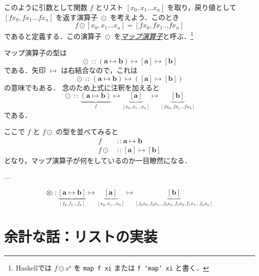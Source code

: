 \documentclass[a4paper,draft]{jsbook}
\newcommand{\programminglanguage}[1]{\textsf{#1}}
\newcommand{\haskell}{\programminglanguage{Haskell}}
\newcommand{\keyword}[1]{{\underline{\emph{#1}}}}
\newcommand{\code}[1]{\texttt{#1}}
\newcommand{\mType}[1]{\mathbf{#1}}
\newcommand{\mListType}[1]{[\mType{#1}]}
\newcommand{\mListWith}[1]{\left[#1\right]}
\newcommand{\mList}[1]{{#1}^\mathrm{s}}
\DeclareMathOperator{\mIn}{{:\!:}}
\DeclareMathOperator{\mMapsTo}{\mapsto}
\DeclareMathOperator{\mMapList}{\odot}
\newcommand{\mProjection}[2]{#1\mMapsTo#2}
\newcommand{\mathTypeParameter}[1]{\mathbf{#1}}
\newcommand{\mathListWith}[1]{\left[#1\right]}
\newcommand{\mathApplicativeMap}{\mathbin{\otimes}}
\newcommand{\mathIn}{\mathrel{::}}
\begin{document}
このように引数として関数 $f$ とリスト $\mListWith{x_0,x_1\dots x_n}$ を取り，戻り値として $\mListWith{fx_0,fx_1\dots fx_n}$ を返す演算子 $\mMapList$ を考えよう．このとき
\begin{equation}
f\mMapList\mListWith{x_0,x_1\dots x_n}
=\mListWith{fx_0,fx_1\dots fx_n}
\end{equation}
であると定義する．この演算子 $\mMapList$ を\keyword{マップ演算子}と呼ぶ．\footnote{\haskell では $f\mMapList\mList{x}$ を \code{map f xi} または \code{f `map` xi} と書く．}

マップ演算子の型は
\begin{equation}
\mMapList
\mIn{}
\mProjection{(\mProjection{\mType{a}}{\mType{b}})}
{\mProjection{\mListType{a}}{\mListType{b}}}
\end{equation}
である．矢印 $\mMapsTo$ は右結合なので，これは
\begin{equation}
\mMapList
\mIn{}
\mProjection{(\mProjection{\mType{a}}{\mType{b}})}
{(\mProjection{\mListType{a}}{\mListType{b}})}
\end{equation}
の意味でもある．
念のため上式に注釈を加えると
\begin{equation}
\mMapList\mIn
\underbrace{\left(\mType{a}\mMapsTo\mType{b}\right)}_f
\mMapsTo
\underbrace{\mListType{a}}_{\mListWith{x_0,x_1\dots x_n}}
\mMapsTo
\underbrace{\mListType{b}}_{\mListWith{fx_0,fx_1\dots fx_n}}
\end{equation}
である．

ここで $f$ と $f\mMapList$ の型を並べてみると
\begin{align}
f&\mIn\mProjection{\mType{a}}{\mType{b}}\\
f\mMapList&\mIn\mProjection{\mListType{a}}{\mListType{b}}
\end{align}
となり，マップ演算子が何をしているのか一目瞭然になる．

---


\begin{equation*}
\mathApplicativeMap\mathIn
\underbrace{\mathListWith{\mathTypeParameter{a}\mMapsTo\mathTypeParameter{b}}}_{\mathListWith{f_0,f_1\dots f_n}}
\mMapsTo
\underbrace{\mListType{a}}_{\mathListWith{x_0,x_1\dots x_n}}
\mMapsTo
\underbrace{\mListType{\mathTypeParameter{b}}}_{\mathListWith{f_0x_0,f_0x_1\dots f_0x_n,f_1x_0,f_1x_1\dots f_nx_n}}
\end{equation*}


\section{余計な話：リストの実装}
\end{document}
